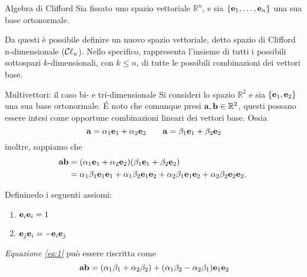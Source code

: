 \begin{frame}{Algebra di Clifford}
    Sia fissato uno spazio vettoriale \(\mathbb{R}^{n}\), e sia 
    \(\{\mathbf{e}_{1}, \ldots, \mathbf{e}_{n}\}\) una sua base ortonormale.

    Da questi è possibile definire un nuovo spazio vettoriale,
    detto spazio di Clifford n-dimensionale (\(\Clifford\)).
    Nello specifico, \Clifford rappresenta l'insieme di tutti i 
    possibili sottospazi \(k\)-dimensionali, con \(k \le n\), 
    di tutte le possibili combinazioni dei vettori base.
\end{frame}
\begin{frame}{Multivettori: il caso bi- e tri-dimensionale}
    Si consideri lo spazio \(\mathbb{R}^{2}\) e sia \(\{\mathbf{e}_{1}, 
    \mathbf{e}_{2}\}\) una sua base ortonormale. 
    \'E noto che comunque presi \(\mathbf{a}, \mathbf{b} \in \mathbb{R}^{2}\),
    questi possano essere intesi come opportune combinazioni lineari dei vettori 
    base. Ossia
    \[
        \mathbf{a} = \alpha_{1}\mathbf{e}_{1} + \alpha_{2}\mathbf{e}_{2} 
        \qquad \mathbf{a} = \beta_{1}\mathbf{e}_{1} + \beta_{2}\mathbf{e}_{2}
    \]
    inoltre, sappiamo che 
    \begin{equation}\label{eq:1}
        \begin{aligned}
        \mathbf{ab} & = 
            (\alpha_{1}\mathbf{e}_{1} + \alpha_{2}\mathbf{e}_{2})
            (\beta_{1}\mathbf{e}_{1} + \beta_{2}\mathbf{e}_{2}) \\
            & = \alpha_{1}\beta_{1}\mathbf{e}_{1}\mathbf{e}_{1} +
                \alpha_{1}\beta_{2}\mathbf{e}_{1}\mathbf{e}_{2} +
                \alpha_{2}\beta_{1}\mathbf{e}_{1}\mathbf{e}_{2} + 
                \alpha_{2}\beta_{2}\mathbf{e}_{2}\mathbf{e}_{2}.
        \end{aligned}\
    \end{equation}
\end{frame}
\begin{frame}
    Defininedo i seguenti assiomi:
    \begin{enumerate}
        \item \(\mathbf{e}_{i}\mathbf{e}_{i} = 1\)
        \item \(\mathbf{e}_{j}\mathbf{e}_{i} = - \mathbf{e}_{i}\mathbf{e}_{j}\)
    \end{enumerate}
    \emph{Equazione \eqref{eq:1}} può essere riscritta come 
    \begin{equation}\label{eq:2}
        \mathbf{ab} = (\alpha_{1}\beta_{1} + \alpha_{2}\beta_{2}) + 
            (\alpha_{1}\beta_{2} - \alpha_{2}\beta_{1})\mathbf{e}_{1}\mathbf{e}_{2}
    \end{equation}
\end{frame}
